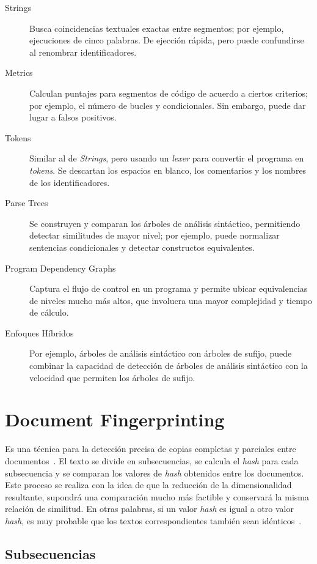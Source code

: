 \begin{description}
  \item [Strings] Busca coincidencias textuales exactas entre segmentos; por ejemplo, ejecuciones de cinco palabras. De ejección rápida, pero puede confundirse al renombrar identificadores.
  \item [Metrics] Calculan puntajes para segmentos de código de acuerdo a ciertos criterios; por ejemplo, el número de bucles y condicionales. Sin embargo, puede dar lugar a falsos positivos.
  \item [Tokens] Similar al de \textit{Strings}, pero usando un \textit{lexer} para convertir el programa en \textit{tokens}. Se descartan los espacios en blanco, los comentarios y los nombres de los identificadores.
  \item [Parse Trees] Se construyen y comparan los árboles de análisis sintáctico, permitiendo detectar similitudes de mayor nivel; por ejemplo, puede normalizar sentencias condicionales y detectar constructos equivalentes.
  \item [Program Dependency Graphs] Captura el flujo de control en un programa y permite ubicar equivalencias de niveles mucho más altos, que involucra una mayor complejidad y tiempo de cálculo.
  \item [Enfoques Híbridos] Por ejemplo, árboles de análisis sintáctico con árboles de sufijo, puede combinar la capacidad de detección de árboles de análisis sintáctico con la velocidad que permiten los árboles de sufijo.
\end{description}

\section{Document Fingerprinting}
\label{sec:doc}

Es una técnica para la detección precisa de copias completas 
y parciales entre documentos~\cite{Lindkvist2005WinnowingA}.
El texto se divide en subsecuencias, se calcula el \textit{hash} para cada 
subsecuencia y se comparan los valores de \textit{hash} obtenidos entre los documentos. 
Este proceso se realiza con la idea de que la reducción de la dimensionalidad resultante,
supondrá una comparación mucho más factible y conservará la misma relación de similitud.
En otras palabras, si un valor \textit{hash} es igual a otro valor \textit{hash}, 
es muy probable que los textos correspondientes también sean idénticos~\cite{Beth2014ACO}.

\subsection{Subsecuencias}

